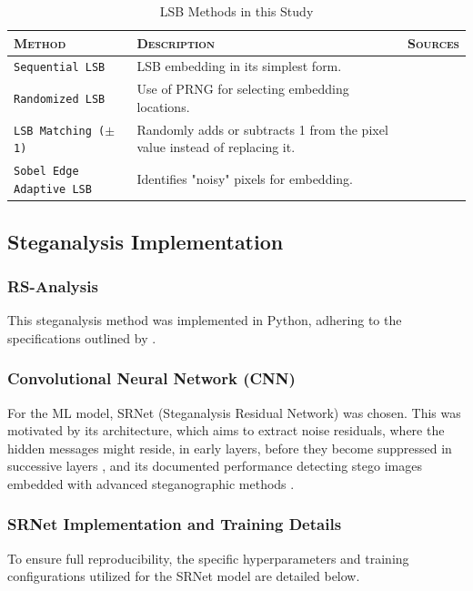 \begin {table} [h]
  \centering
  \begin{tabular}{l p{5cm} p{3cm}} %
    \toprule[1.5pt]
    \textsc{Method} & \textsc{Description} & \textsc{Sources}\\
    \midrule
    \verb|Sequential LSB| & LSB embedding in its simplest form.  & \cite{Chan2004}\\
    \midrule[0.5pt]
    \verb|Randomized LSB| & Use of PRNG for selecting embedding locations. & \cite{Sharp2001} \\
    \midrule[0.5pt]
    \texttt{LSB Matching ($\pm$1)} & Randomly adds or subtracts 1 from the pixel value instead of replacing it. & \cite{Ker2005}\\
    \midrule[0.5pt]
    \verb|Sobel Edge Adaptive LSB| & Identifies "noisy" pixels for embedding. & \cite{Luo2010, smitha2018sobel}\\
    \bottomrule[1.5pt]
  \end{tabular}
  \caption {LSB Methods in this Study}
  \label{tab:lsb_methods}
\end{table}


\subsection{Steganalysis Implementation}
\subsubsection{RS-Analysis}

This steganalysis method was implemented in Python, adhering to the specifications outlined by \textcite{Fridrich2001}.

\subsubsection{Convolutional Neural Network (CNN)}

For the ML model, SRNet (Steganalysis Residual Network) \cite{Boroumand2019} was chosen. 
This was motivated by its architecture, which aims to extract noise residuals, where the hidden messages might reside, 
in early layers, before they become suppressed in successive layers \cite{Wang2021}, 
and its documented performance detecting stego images embedded with advanced steganographic methods \cite{Boroumand2019}.

\subsubsection*{SRNet Implementation and Training Details}
To ensure full reproducibility, the specific hyperparameters and training configurations utilized for the SRNet model are detailed below.

